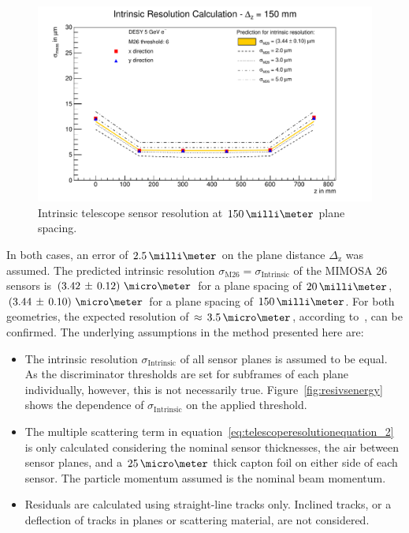 \begin{figure}[hbtp]
\centering
\includegraphics[width=\textwidth]{figures/wide_smiley.pdf}
\caption[Intrinsic telescope sensor resolution at $150\,\milli\meter$ plane
spacing]{Intrinsic telescope sensor resolution at $150\,\milli\meter$ plane
spacing.}
\label{fig:smileythick}
\end{figure}

In both cases, an error of $2.5\,\milli\meter$ on the plane distance
$\Delta_{\textrm{z}}$ was assumed. The predicted intrinsic resolution
$\sigma_{\textrm{M26}} = \sigma_{\textrm{Intrinsic}}$ of the MIMOSA 26 sensors
is \allowbreak$\left( 3.42\,\pm\, \allowbreak 0.12 \right)\,\micro\meter$ for a
plane spacing of
$20\,\milli\meter$, $\left( 3.44\,\pm\,0.10 \right)\,\micro\meter$ for a plane
spacing of $150\,\milli\meter$. For both geometries, the expected resolution of
$\approx\,3.5\,\micro\meter$, according to~\cite{ref:mimosa26}, can be
confirmed. The underlying assumptions in the method presented here are:\\

\begin{itemize}
\item The intrinsic resolution $\sigma_{\textrm{Intrinsic}}$ of all sensor
planes is assumed to be equal. As the discriminator thresholds are set for
subframes of each plane individually, however, this is not necessarily true.
Figure~\ref{fig:resivsenergy} shows the dependence of
$\sigma_{\textrm{Intrinsic}}$ on the applied threshold.\\

\item The multiple scattering term in
equation~\ref{eq:telescoperesolutionequation_2} is only calculated considering
the nominal sensor thicknesses, the air between sensor planes, and a
$25\,\micro\meter$ thick capton foil on either side of each sensor. The particle
momentum assumed is the nominal beam momentum.\\

\item Residuals are calculated using straight-line tracks only. Inclined tracks,
or a deflection of tracks in planes or scattering material, are not
considered.\\
\end{itemize}

